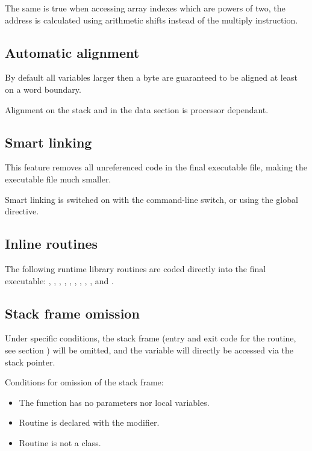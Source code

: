 {The same is true when accessing array indexes which are
powers of two, the address is calculated using arithmetic
shifts instead of the multiply instruction.

\subsection{Automatic alignment}

By default all variables larger then a byte are guaranteed to be aligned
at least on a word boundary.

Alignment on the stack and in the data section is processor dependant.

\subsection{Smart linking}

This feature removes all unreferenced code in the final executable
file, making the executable file much smaller.

Smart linking is switched on with the  command-line switch, or
using the  global directive.

\subsection{Inline routines}

The following runtime library routines are coded directly into the
final executable: , , , ,
, , , , ,
 and .

\subsection{Stack frame omission}

Under specific conditions, the stack frame (entry and exit code for
the routine, see section ) will be omitted, and the
variable will directly be accessed via the stack pointer.

Conditions for omission of the stack frame:

\begin{itemize}
\item The function has no parameters nor local variables.
\item Routine is declared with the  modifier.
\item Routine is not a class.
\end{itemize}

}
